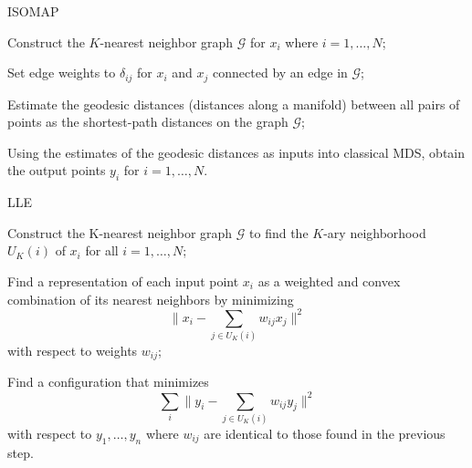 \documentclass{article}
\begin{document}
\begin{algorithm}[!htb]
  \caption{ISOMAP}
  \label{alg:isomap}
  \DontPrintSemicolon
  \SetAlgoLined
  \BlankLine

  Construct the $K$-nearest neighbor graph $\mathcal{G}$ for $x_i$ where $i=1,\ldots,N$;

  Set edge weights to $\delta_{ij}$ for $x_i$ and $x_j$ connected by an edge in $\mathcal{G}$;

  Estimate the geodesic distances (distances along a manifold) between all pairs of points as the shortest-path distances on the graph $\mathcal{G}$;

  Using the estimates of the geodesic distances as inputs into classical MDS, obtain the output points $y_i$ for $i=1,\ldots,N$.

\end{algorithm}


\begin{algorithm}[!htb]
  \caption{LLE}
  \label{alg:lle}
  \DontPrintSemicolon
  \SetAlgoLined
  \BlankLine

  Construct the K-nearest neighbor graph $\mathcal{G}$ to find the $K$-ary neighborhood $U_K(i)$ of $x_i$ for all $i=1,\ldots,N$;

  Find a representation of each input point $x_i$ as a weighted and convex combination of its nearest neighbors by minimizing
  $$
    \bigg\|x_{i}-\sum_{j \in U_K(i)} w_{i j} x_{j}\bigg\|^{2}
  $$
  with respect to weights $w_{ij}$;

  Find a configuration that minimizes
  $$
    \sum_{i}\bigg\|y_{i}-\sum_{j \in U_K(i)} w_{i j} y_{j}\bigg\|^{2}
  $$
  with respect to $y_{1}, \dots, y_{n}$ where $w_{ij}$ are identical to those found in the previous step.

\end{algorithm}
\end{document}
